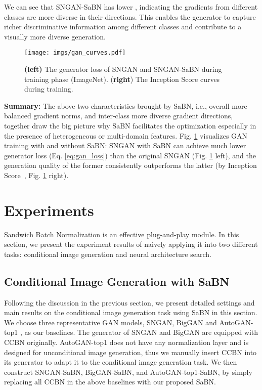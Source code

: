 \documentclass{article}
\begin{document}
We can see that SNGAN-SaBN has lower , indicating the gradients from different classes are more diverse in their directions. This enables the generator to capture richer discriminative information among different classes and contribute to a visually more diverse generation. 

\begin{figure}[t!]
\begin{center}
 \texttt{[image: imgs/gan\_curves.pdf]}
\end{center}
\caption{\textbf{(left)} The generator loss  of SNGAN and SNGAN-SaBN during training phase (ImageNet). (\textbf{right}) The Inception Score curves during training.}
\label{fig:g_loss}
\end{figure}
\textbf{Summary:} The above two characteristics brought by SaBN, i.e., overall more balanced gradient norms, and inter-class more diverse gradient directions, together draw the big picture why SaBN facilitates the optimization especially in the presence of heterogeneous or multi-domain features. Fig. \ref{fig:g_loss} visualizes GAN training with and without SaBN: SNGAN with SaBN can achieve much lower generator loss  (Eq. \ref{eq:gan_loss}) than the original SNGAN (Fig. \ref{fig:g_loss} left), and the generation quality of the former consistently outperforms the latter (by Inception Score~\citep{salimans2016improved}, Fig. \ref{fig:g_loss} right).



 \section{Experiments}
Sandwich Batch Normalization is an effective plug-and-play module. In this section, we present the experiment results of naively applying it into two different tasks: conditional image generation and neural architecture search. 

\subsection{Conditional Image Generation with SaBN} \label{sec:gan}
Following the discussion in the previous section, we present detailed settings and main results on the conditional image generation task using SaBN in this section. We choose three representative GAN models, SNGAN, BigGAN \citep{brock2018large} and AutoGAN-top1 \citep{gong2019autogan}, as our baselines. The generator of SNGAN and BigGAN are equipped with CCBN originally. AutoGAN-top1 does not have any normalization layer and is designed for unconditional image generation, thus we manually insert CCBN into its generator to adapt it to the conditional image generation task. We then construct SNGAN-SaBN, BigGAN-SaBN, and AutoGAN-top1-SaBN, by simply replacing all CCBN in the above baselines with our proposed SaBN. 
\end{document}
